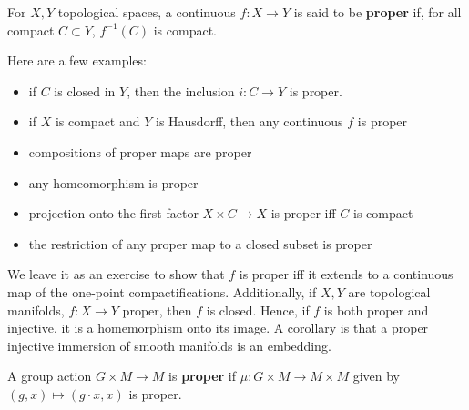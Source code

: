 \documentclass{../mathnotes}
\begin{document}
\begin{defn}
    For $X,Y$ topological spaces, a continuous $f:X\to Y$ is said to be \textbf{proper} if, for all compact $C\subset Y$, $f^{-1}(C)$ is compact.
\end{defn}

\begin{exmp}
    Here are a few examples:
    \begin{itemize}
        \item if $C$ is closed in $Y$, then the inclusion $i:C\to Y$ is proper.
        \item if $X$ is compact and $Y$ is Hausdorff, then any continuous $f$ is proper
        \item compositions of proper maps are proper
        \item any homeomorphism is proper
        \item projection onto the first factor $X\times C\to X$ is proper iff $C$ is compact
        \item the restriction of any proper map to a closed subset is proper
    \end{itemize}
    We leave it as an exercise to show that $f$ is proper iff it extends to a continuous map of the one-point compactifications.
    Additionally, if $X,Y$ are topological manifolds, $f:X\to Y$ proper, then $f$ is closed. Hence, if $f$ is both proper and injective,
    it is a homemorphism onto its image. A corollary is that a proper injective immersion of smooth manifolds is an embedding.
\end{exmp}

\begin{defn}
    A group action $G\times M\to M$ is \textbf{proper} if $\mu:G\times M\to M\times M$ given by $(g,x)\mapsto (g\cdot x, x)$ is proper.
\end{defn}
\end{document}
